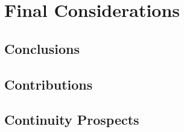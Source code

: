 \chapter{Final Considerations}
\label{ch:final_considerations}

\section{Conclusions}

\section{Contributions}

\section{Continuity Prospects}
